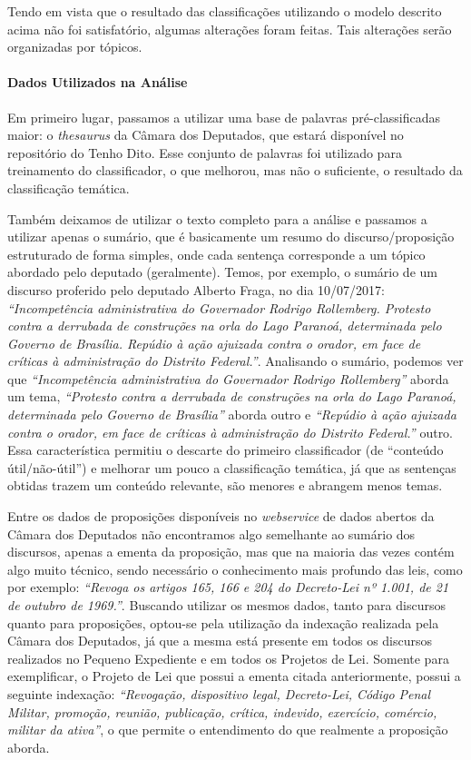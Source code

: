 Tendo em vista que o resultado das classificações utilizando o modelo descrito acima não foi satisfatório, algumas alterações foram feitas. Tais alterações serão organizadas por tópicos.

\paragraph{Dados Utilizados na Análise}

Em primeiro lugar, passamos a utilizar uma base de palavras pré-classificadas maior: o \textit{thesaurus} da Câmara dos Deputados, que estará disponível no repositório do Tenho Dito. Esse conjunto de palavras foi utilizado para treinamento do classificador, o que melhorou, mas não o suficiente, o resultado da classificação temática.

Também deixamos de utilizar o texto completo para a análise e passamos a utilizar apenas o sumário, que é basicamente um resumo do discurso/proposição estruturado de forma simples, onde cada sentença corresponde a um tópico abordado pelo deputado (geralmente). Temos, por exemplo, o sumário de um discurso proferido pelo deputado Alberto Fraga, no dia 10/07/2017: \textit{``Incompetência administrativa do Governador Rodrigo Rollemberg. Protesto contra a derrubada de construções na orla do Lago Paranoá, determinada pelo Governo de Brasília. Repúdio à ação ajuizada contra o orador, em face de críticas à administração do Distrito Federal.''}. Analisando o sumário, podemos ver que \textit{``Incompetência administrativa do Governador Rodrigo Rollemberg''} aborda um tema, \textit{``Protesto contra a derrubada de construções na orla do Lago Paranoá, determinada pelo Governo de Brasília''} aborda outro e \textit{``Repúdio à ação ajuizada contra o orador, em face de críticas à administração do Distrito Federal.''} outro. Essa característica permitiu o descarte do primeiro classificador (de ``conteúdo útil/não-útil'') e melhorar um pouco a classificação temática, já que as sentenças obtidas trazem um conteúdo relevante, são menores e abrangem menos temas.

Entre os dados de proposições disponíveis no \textit{webservice} de dados abertos da Câmara dos Deputados não encontramos algo semelhante ao sumário dos discursos, apenas a ementa da proposição, mas que na maioria das vezes contém algo muito técnico, sendo necessário o conhecimento mais profundo das leis, como por exemplo: \textit{``Revoga os artigos 165, 166 e 204 do Decreto-Lei nº 1.001, de 21 de outubro de 1969.''}. Buscando utilizar os mesmos dados, tanto para discursos quanto para proposições, optou-se pela utilização da indexação realizada pela Câmara dos Deputados, já que a mesma está presente em todos os discursos realizados no Pequeno Expediente e em todos os Projetos de Lei. Somente para exemplificar, o Projeto de Lei que possui a ementa citada anteriormente, possui a seguinte indexação: \textit{``Revogação, dispositivo legal, Decreto-Lei, Código Penal Militar, promoção, reunião, publicação, crítica, indevido, exercício, comércio, militar da ativa''}, o que permite o entendimento do que realmente a proposição aborda.

